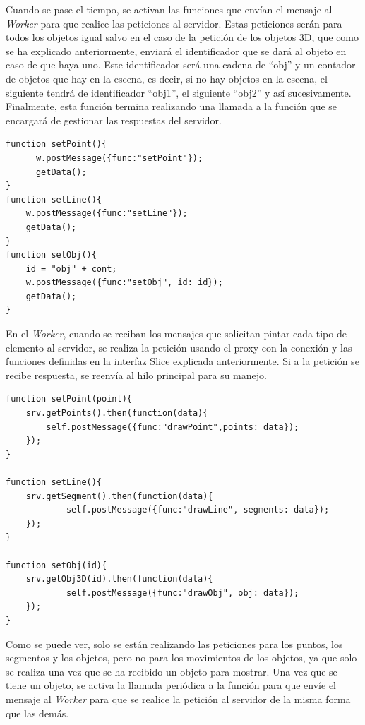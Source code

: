 Cuando se pase el tiempo, se activan las funciones que envían el mensaje al \textit{Worker} para que realice las peticiones al servidor. Estas peticiones serán para todos los objetos igual salvo en el caso de la petición de los objetos 3D, que como se ha explicado anteriormente, enviará el identificador que se dará al objeto en caso de que haya uno. Este identificador será una cadena de ``obj'' y un contador de objetos que hay en la escena, es decir, si no hay objetos en la escena, el siguiente tendrá de identificador ``obj1'', el siguiente ``obj2'' y así sucesivamente. Finalmente, esta función termina realizando una llamada a la función que se encargará de gestionar las respuestas del servidor.

\begin{lstlisting}[caption= Definición de las funciones de petición, label=cod.funcionespeticion]
function setPoint(){
      w.postMessage({func:"setPoint"});
      getData();
}
function setLine(){
	w.postMessage({func:"setLine"});
	getData();
}
function setObj(){
	id = "obj" + cont;
	w.postMessage({func:"setObj", id: id});
	getData();
}
\end{lstlisting}

En el \textit{Worker}, cuando se reciban los mensajes que solicitan pintar cada tipo de elemento al servidor, se realiza la petición usando el proxy con la conexión y las funciones definidas en la interfaz Slice explicada anteriormente. Si a la petición se recibe respuesta, se reenvía al hilo principal para su manejo.

\begin{lstlisting}[caption= Código que realiza las peticiones al servidor, label=cod.peticiones]
function setPoint(point){
 	srv.getPoints().then(function(data){
		self.postMessage({func:"drawPoint",points: data});
	});
}

function setLine(){
	srv.getSegment().then(function(data){
      		self.postMessage({func:"drawLine", segments: data});
  	});
}

function setObj(id){
  	srv.getObj3D(id).then(function(data){
    		self.postMessage({func:"drawObj", obj: data});
  	});
}
\end{lstlisting}

Como se puede ver, solo se están realizando las peticiones para los puntos, los segmentos y los objetos, pero no para los movimientos de los objetos, ya que solo se realiza una vez que se ha recibido un objeto para mostrar. Una vez que se tiene un objeto, se activa la llamada periódica a la función para que envíe el mensaje al \textit{Worker} para que se realice la petición al servidor de la misma forma que las demás.

